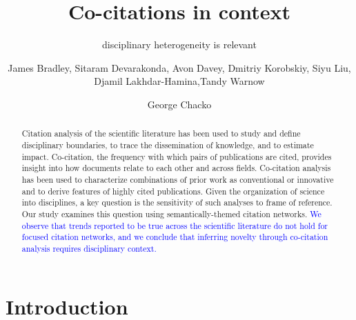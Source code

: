 \documentclass[NETN]{stjour}
\begin{document}
\title[Co-citations in context]{Co-citations in context}
\subtitle{disciplinary heterogeneity is relevant}



\author[Author Names]
{James Bradley,
Sitaram Devarakonda, Avon Davey, Dmitriy Korobskiy, Siyu Liu, Djamil Lakhdar-Hamina,Tandy Warnow
\and George Chacko}



\begin{abstract}
Citation analysis of the scientific literature has been used to study and define disciplinary boundaries, to trace the dissemination of knowledge, and to estimate impact. Co-citation, the frequency with which pairs of publications are cited, provides insight into how documents relate to each other and across fields. Co-citation analysis has been used to characterize combinations of prior work as conventional or innovative and to derive features of highly cited publications. Given the organization of science into disciplines, a key question is the sensitivity of such analyses to frame of reference. Our study examines this question using  semantically-themed citation networks. \textcolor{blue}{We observe that trends reported to be true across the scientific literature do not hold for focused citation networks, and we conclude that inferring novelty through co-citation analysis requires disciplinary context.}
\end{abstract}

\section{Introduction}
\end{document}
